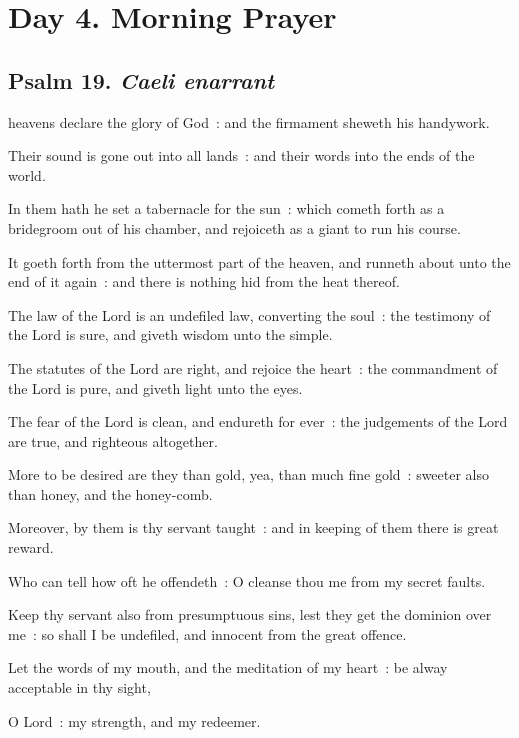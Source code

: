 \section*{Day 4. Morning Prayer}

\subsection{Psalm 19. \textit{Caeli enarrant}}


 heavens declare the glory of God~: and the firmament sheweth his handywork.\par
{}
Their sound is gone out into all lands~: and their words into the ends of the world.\par
{}In them hath he set a tabernacle for the sun~: which cometh forth as a bridegroom out of his chamber, and rejoiceth as a giant to run his course.\par
{}It goeth forth from the uttermost part of the heaven, and runneth about unto the end of it again~: and there is nothing hid from the heat thereof.\par
{}The law of the Lord is an undefiled law, converting the soul~: the testimony of the Lord is sure, and giveth wisdom unto the simple.\par
{}The statutes of the Lord are right, and rejoice the heart~: the commandment of the Lord is pure, and giveth light unto the eyes.\par
{}The fear of the Lord is clean, and endureth for ever~: the judgements of the Lord are true, and righteous altogether.\par
{}More to be desired are they than gold, yea, than much fine gold~: sweeter also than honey, and the honey-comb.\par
{}Moreover, by them is thy servant taught~: and in keeping of them there is great reward.\par
{}Who can tell how oft he offendeth~: O cleanse thou me from my secret faults.\par
{}Keep thy servant also from presumptuous sins, lest they get the dominion over me~: so shall I be undefiled, and innocent from the great offence.\par
{}Let the words of my mouth, and the meditation of my heart~: be alway acceptable in thy sight,\par
{}O Lord~: my strength, and my redeemer.\par

